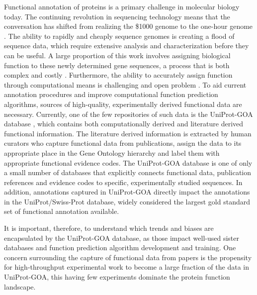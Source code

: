 \documentclass[10pt]{article}
\begin{document}
Functional annotation of proteins is a primary challenge in molecular biology
today\cite{Friedberg2006Automated,Erdin2011180,Rentzsch2009210}. The continuing revolution in sequencing technology
means that the conversation has shifted from realizing the \$1000 genome to the one-hour genome \cite{PMID
Stahl2012Toward}. The ability to rapidly and cheaply sequence genomes is creating a flood of sequence data, which require
extensive analysis and characterization before they can be useful.  A large proportion of this work involves
assigning biological function to these newly determined gene sequences, a process that is both complex and costly
\cite{Sboner2011Real}.  Furthermore,  the ability to accurately assign function through computational
means is challenging and open problem \cite{Schnoes2009Annotation}. To aid current annotation procedures
and improve computational function prediction algorithms, sources of high-quality, experimentally derived
functional data are necessary.  Currently, one of the few repositories of such data is the UniProt-GOA database
\cite{Dimmer2012UniProtGO}, which contains both computationally derived and literature derived functional information. The
literature derived information is extracted by human curators who capture functional data from publications, assign
the data to its appropriate place in the Gene Ontology hierarchy \cite{Ashburner2000Gene} and label them with appropriate
functional evidence codes. The UniProt-GOA database is one of only a small number of databases that explicitly
connects functional data, publication references and evidence codes to specific, experimentally studied sequences.
In addition, annotations captured in UniProt-GOA directly impact the annotations in the UniProt/Swiss-Prot
database, widely considered the largest gold standard set of functional annotation \cite{swissprot ref, Schnoes
2009} available. 

It is important, therefore, to understand which trends and biases are
encapsulated by the UniProt-GOA database, as those impact well-used sister
databases and function prediction algorithm development and training. One
concern surrounding the capture of functional data from papers is the
propensity for high-throughput experimental work to become a large fraction of
the data in UniProt-GOA, this having few experiments dominate the protein function landscape.
\end{document}
